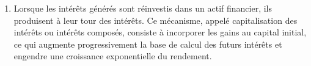 \documentclass{article}
\begin{document}
\begin{enumerate}[label=\textbf{R1.\arabic*}]
    \item Lorsque les intérêts générés sont réinvestis dans un actif financier, ils produisent à leur tour des intérêts. Ce mécanisme, appelé capitalisation des intérêts ou intérêts composés, consiste à incorporer les gains au capital initial, ce qui augmente progressivement la base de calcul des futurs intérêts et engendre une croissance exponentielle du rendement.
\end{enumerate}
\end{document}
